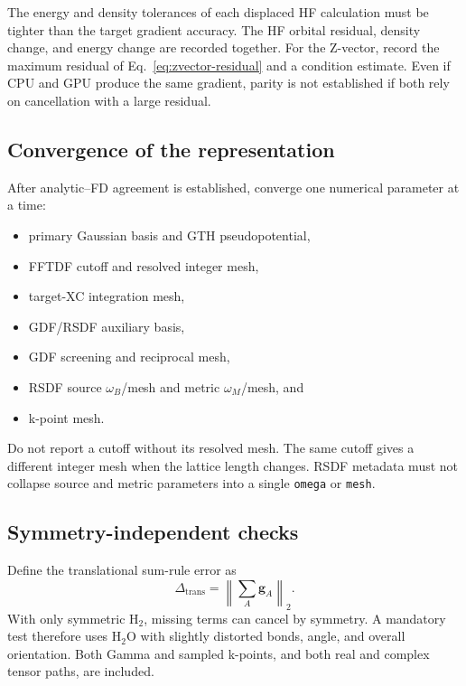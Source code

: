 The energy and density tolerances of each displaced HF calculation must be
tighter than the target gradient accuracy.  The HF orbital residual, density
change, and energy change are recorded together.  For the Z-vector, record the
maximum residual of Eq.~\eqref{eq:zvector-residual} and a condition estimate.
Even if CPU and GPU produce the same gradient, parity is not established if
both rely on cancellation with a large residual.

\subsection{Convergence of the representation}

After analytic--FD agreement is established, converge one numerical parameter
at a time:
\begin{itemize}
  \item primary Gaussian basis and GTH pseudopotential,
  \item FFTDF cutoff and resolved integer mesh,
  \item target-XC integration mesh,
  \item GDF/RSDF auxiliary basis,
  \item GDF screening and reciprocal mesh,
  \item RSDF source $\omega_B$/mesh and metric $\omega_M$/mesh, and
  \item k-point mesh.
\end{itemize}

Do not report a cutoff without its resolved mesh.  The same cutoff gives a
different integer mesh when the lattice length changes.  RSDF metadata must
not collapse source and metric parameters into a single \texttt{omega} or
\texttt{mesh}.

\subsection{Symmetry-independent checks}

Define the translational sum-rule error as
\begin{equation}
  \Delta_{\mathrm{trans}}
  =\left\|\sum_A\mathbf g_A\right\|_2.
  \label{eq:translation-error}
\end{equation}
With only symmetric H$_2$, missing terms can cancel by symmetry.  A mandatory
test therefore uses H$_2$O with slightly distorted bonds, angle, and overall
orientation.  Both Gamma and sampled k-points, and both real and complex
tensor paths, are included.

